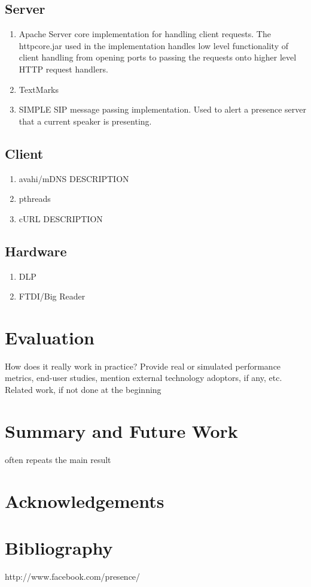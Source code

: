 \documentclass{article}
\begin{document}
\subsection{Server}

	\begin{enumerate}
	\item	Apache
	Server core implementation for handling client requests. The httpcore.jar used in the implementation handles low level functionality of client handling from opening ports to passing the requests onto higher level HTTP request handlers.
		
	\item	TextMarks
	
	\item SIMPLE
	SIP message passing implementation. Used to alert a presence server that a current speaker is presenting.
	
	

\end{enumerate}



\subsection{Client}

\begin{enumerate}
\item avahi/mDNS
DESCRIPTION
\item pthreads

\item cURL
DESCRIPTION
\end{enumerate}


\subsection{Hardware}
\begin{enumerate}
\item DLP

\item FTDI/Big Reader

\end{enumerate}
		
		
		

	

		



\section{Evaluation}
How does it really work in practice? Provide real or simulated performance metrics, end-user studies, mention external technology adoptors, if any, etc. 
Related work, if not done at the beginning 
\section{Summary and Future Work}
often repeats the main result 
\section{Acknowledgements}
\section{Bibliography} 
http://www.facebook.com/presence/
\end{document}
